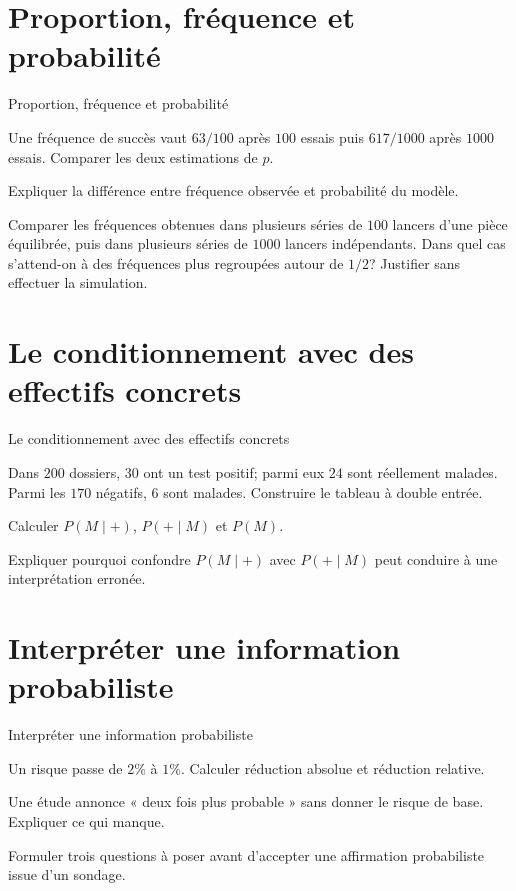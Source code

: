 \section{Proportion, fréquence et probabilité}
\label{workbook:section:08.07}
\begin{exerciseblock}{Proportion, fréquence et probabilité}
\item Une fréquence de succès vaut $63/100$ après $100$ essais puis $617/1000$ après $1000$ essais. Comparer les deux estimations de $p$.
\item Expliquer la différence entre fréquence observée et probabilité du modèle.
\item Comparer les fréquences obtenues dans plusieurs séries de $100$ lancers d'une pièce équilibrée, puis dans plusieurs séries de $1000$ lancers indépendants. Dans quel cas s'attend-on à des fréquences plus regroupées autour de $1/2$? Justifier sans effectuer la simulation.
\end{exerciseblock}
\section{Le conditionnement avec des effectifs concrets}
\label{workbook:section:08.08}
\begin{exerciseblock}{Le conditionnement avec des effectifs concrets}
\item Dans $200$ dossiers, $30$ ont un test positif; parmi eux $24$ sont réellement malades. Parmi les $170$ négatifs, $6$ sont malades. Construire le tableau à double entrée.
\item Calculer $P(M\mid +)$, $P(+\mid M)$ et $P(M)$.
\item Expliquer pourquoi confondre $P(M\mid +)$ avec $P(+\mid M)$ peut conduire à une interprétation erronée.
\end{exerciseblock}
\section{Interpréter une information probabiliste}
\label{workbook:section:08.09}
\begin{exerciseblock}{Interpréter une information probabiliste}
\item Un risque passe de $2\%$ à $1\%$. Calculer réduction absolue et réduction relative.
\item Une étude annonce « deux fois plus probable » sans donner le risque de base. Expliquer ce qui manque.
\item Formuler trois questions à poser avant d'accepter une affirmation probabiliste issue d'un sondage.
\end{exerciseblock}
